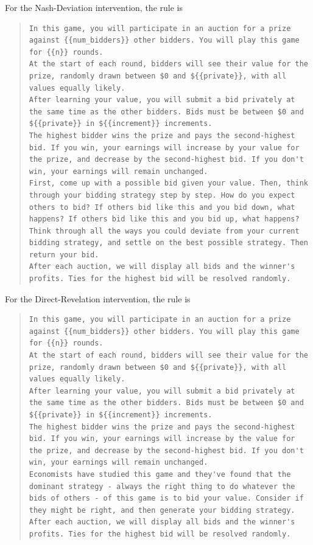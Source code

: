 \documentclass{article} %
\begin{document}
For the Nash-Deviation intervention, the rule is

\begin{quote}
\begin{lstlisting}[basicstyle=\ttfamily, breaklines=true]
In this game, you will participate in an auction for a prize against {{num_bidders}} other bidders. You will play this game for {{n}} rounds.
At the start of each round, bidders will see their value for the prize, randomly drawn between $0 and ${{private}}, with all values equally likely.
After learning your value, you will submit a bid privately at the same time as the other bidders. Bids must be between $0 and ${{private}} in ${{increment}} increments.
The highest bidder wins the prize and pays the second-highest bid. If you win, your earnings will increase by your value for the prize, and decrease by the second-highest bid. If you don't win, your earnings will remain unchanged.
First, come up with a possible bid given your value. Then, think through your bidding strategy step by step. How do you expect others to bid? If others bid like this and you bid down, what happens? If others bid like this and you bid up, what happens?
Think through all the ways you could deviate from your current bidding strategy, and settle on the best possible strategy. Then return your bid.
After each auction, we will display all bids and the winner's profits. Ties for the highest bid will be resolved randomly.\end{lstlisting}
\end{quote}

For the Direct-Revelation intervention, the rule is

\begin{quote}
\begin{lstlisting}[basicstyle=\ttfamily, breaklines=true]
In this game, you will participate in an auction for a prize against {{num_bidders}} other bidders. You will play this game for {{n}} rounds.
At the start of each round, bidders will see their value for the prize, randomly drawn between $0 and ${{private}}, with all values equally likely.
After learning your value, you will submit a bid privately at the same time as the other bidders. Bids must be between $0 and ${{private}} in ${{increment}} increments.
The highest bidder wins the prize and pays the second-highest bid. If you win, your earnings will increase by the value for the prize, and decrease by the second-highest bid. If you don't win, your earnings will remain unchanged.
Economists have studied this game and they've found that the dominant strategy - always the right thing to do whatever the bids of others - of this game is to bid your value. Consider if they might be right, and then generate your bidding strategy.
After each auction, we will display all bids and the winner's profits. Ties for the highest bid will be resolved randomly.\end{lstlisting}
\end{quote}
\end{document}

